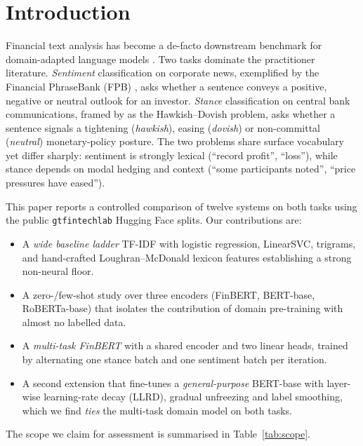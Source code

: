 \documentclass[conference, 10pt, twocolumn]{IEEEtran}
\begin{document}
\section{Introduction}
\label{sec:intro}
Financial text analysis has become a de-facto downstream benchmark for
domain-adapted language models \cite{araci2019finbert, yang2020finbert}. Two
tasks dominate the practitioner literature. \emph{Sentiment} classification
on corporate news, exemplified by the Financial PhraseBank (FPB)
\cite{malo2014good}, asks whether a sentence conveys a positive, negative
or neutral outlook for an investor. \emph{Stance} classification on central
bank communications, framed by \citet{shah2023trillion} as the
Hawkish--Dovish problem, asks whether a sentence signals a tightening
(\emph{hawkish}), easing (\emph{dovish}) or non-committal (\emph{neutral})
monetary-policy posture. The two problems share surface vocabulary yet
differ sharply: sentiment is strongly lexical (``record profit'', ``loss''),
while stance depends on modal hedging and context (``some participants
noted'', ``price pressures have eased'').

This paper reports a controlled comparison of twelve systems on both tasks
using the public \texttt{gtfintechlab} Hugging Face splits.  Our
contributions are:
\begin{itemize}[leftmargin=1.1em,itemsep=0.15em,topsep=0.2em]
    \item A \emph{wide baseline ladder} TF-IDF with logistic regression,
          LinearSVC, trigrams, and hand-crafted Loughran--McDonald lexicon
          features establishing a strong non-neural floor.
    \item A zero-/few-shot study over three encoders (FinBERT, BERT-base,
          RoBERTa-base) that isolates the contribution of domain
          pre-training with almost no labelled data.
    \item A \emph{multi-task FinBERT} with a shared encoder and two linear
          heads, trained by alternating one stance batch and one sentiment
          batch per iteration.
    \item A second extension that fine-tunes a \emph{general-purpose}
          BERT-base with layer-wise learning-rate decay (LLRD), gradual
          unfreezing and label smoothing, which we find \emph{ties} the
          multi-task domain model on both tasks.
\end{itemize}

The scope we claim for assessment is summarised in
Table~\ref{tab:scope}.
\end{document}
